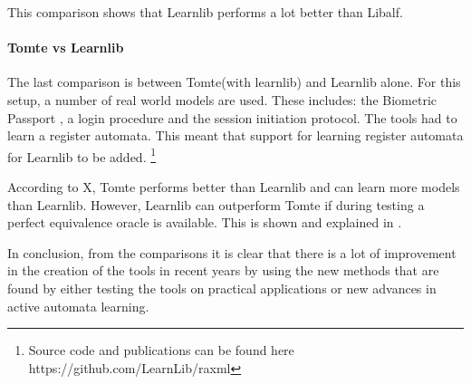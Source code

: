 \documentclass[multi,crop=false,class=article]{standalone}
\begin{document}
This comparison shows that Learnlib performs a lot better than Libalf. 

\paragraph{Tomte vs Learnlib}
The last comparison is between Tomte(with learnlib) and Learnlib alone. 
For this setup, a number of real world models are used. These includes: the 
Biometric Passport \cite{Aarts2010}, a login procedure and the session 
initiation protocol. The tools had to learn a register automata. This meant 
that support for learning register automata for Learnlib to be added. 
\footnote{Source code and publications can be found here 
https://github.com/LearnLib/raxml}

According to X, Tomte performs better than Learnlib and can learn more models 
than Learnlib. However, Learnlib can outperform Tomte if during testing a 
perfect equivalence oracle is available. This is shown and explained in 
\cite{Aarts2014}.



In conclusion, from the comparisons it is clear that there is a lot of 
improvement in the creation of the tools in recent years by using the new 
methods that are found by either testing the tools on practical applications or 
new advances in active automata learning.
\end{document}
